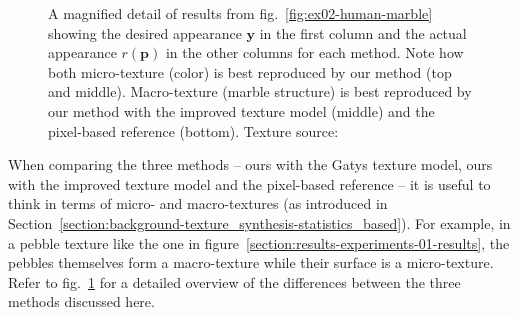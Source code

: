 \begin{figure}[]
\begin{subfigure}{0.6\textwidth}
\begin{subfigure}{0.48\textwidth}
            \begin{subfigure}{\textwidth}
                \centering
                \caption*{}
            \end{subfigure}
        \end{subfigure}
    \end{subfigure}
    \caption{A magnified detail of results from fig.~\ref{fig:ex02-human-marble} showing the desired appearance \(\bm{y}\) in the first column and the actual appearance \(r(\bm{p})\) in the other columns for each method. Note how both micro-texture (color) is best reproduced by our method (top and middle). Macro-texture (marble structure) is best reproduced by our method with the improved texture model (middle) and the pixel-based reference (bottom). Texture source: \citet{Pixar128}}
    \label{fig:ex02-human-marble-detail}
\end{figure}

When comparing the three methods -- ours with the Gatys texture model, ours with the improved texture model and the pixel-based reference -- it is useful to think in terms of micro- and macro-textures (as introduced in Section~\ref{section:background-texture_synthesis-statistics_based}). For example, in a pebble texture like the one in figure~\ref{section:results-experiments-01-results}, the pebbles themselves form a macro-texture while their surface is a micro-texture. Refer to fig.~\ref{fig:ex02-human-marble-detail} for a detailed overview of the differences between the three methods discussed here.

